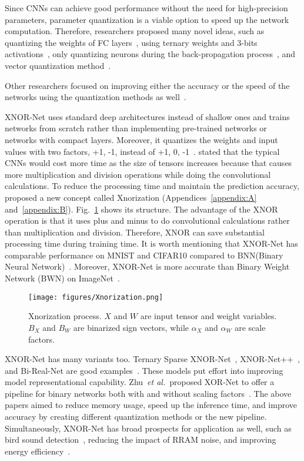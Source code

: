 \documentclass[sn-mathphys,iicol,Numbered]{sn-jnl}
\newcommand{\etal}{\textit{et al.}}
\begin{document}
Since CNNs can achieve good performance without the need for high-precision parameters, parameter quantization is a viable option to speed up the network computation. Therefore, researchers proposed many novel ideas, such as quantizing the weights of FC layers~\citep{A35_Vector_Q}, using ternary weights and 3-bits activations~\citep{A36_fix}, only quantizing neurons during the back-propagation process~\citep{A37_mul}, and vector quantization method~\citep{A47_vec_quant}.

Other researchers focused on improving either the accuracy or the speed of the networks using the quantization methods as well~\cite{A39_grdy, A40_low_bit, A41_prune}.

XNOR-Net uses standard deep architectures instead of shallow ones and trains networks from scratch rather than implementing pre-trained networks or networks with compact layers. Moreover, it quantizes the weights and input values with two factors, +1, -1, instead of +1, 0, -1~\citep{A38_probnd}. \cite{A2_xnor} stated that the typical CNNs would cost more time as the size of tensors increases because that causes more multiplication and division operations while doing the convolutional calculations. To reduce the processing time and maintain the prediction accuracy, \cite{A2_xnor} proposed a new concept called Xnorization (Appendices~\ref{appendix:A} and~\ref{appendix:B}). Fig.~\ref{fig:xnorization} shows its structure. The advantage of the XNOR operation is that it uses plus and minus to do convolutional calculations rather than multiplication and division. Therefore, XNOR can save substantial processing time during training time. It is worth mentioning that XNOR-Net has comparable performance on MNIST and CIFAR10 compared to BNN(Binary Neural Network)~\citep{A2_xnor}. Moreover, XNOR-Net is more accurate than Binary Weight Network (BWN) on ImageNet~\citep{A48_img_net}.

\begin{figure} [ht]
\centering
\caption{Xnorization process. $X$ and $W$ are input tensor and weight variables. $B_{X}$ and $B_{W}$ are binarized sign vectors, while $\alpha_{X}$ and $\alpha_{W}$ are scale factors.}
\texttt{[image: figures/Xnorization.png]}
\vspace{-0.3cm}
\label{fig:xnorization}
\end{figure}

XNOR-Net has many variants too. Ternary Sparse XNOR-Net~\cite{A25_ternary_xnor}, XNOR-Net++~\cite{A26_x++}, and Bi-Real-Net are good examples~\citep{A27_Bi_Real}. These models put effort into improving model representational capability. Zhu~\etal~proposed XOR-Net to offer a pipeline for binary networks both with and without scaling factors~\citep{A28_XOR}. The above papers aimed to reduce memory usage, speed up the inference time, and improve accuracy by creating different quantization methods or the new pipeline. Simultaneously, XNOR-Net has broad prospects for application as well, such as bird sound detection~\citep{A57_Bird_Sound_Detection}, reducing the impact of RRAM noise, and improving energy efficiency~\citep{A58_RRAM}.
\end{document}
